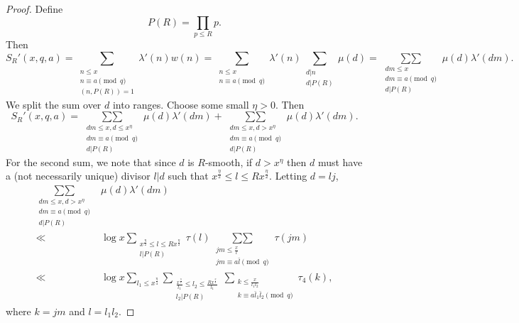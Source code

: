 \documentclass{amsart}
\begin{document}
\begin{proof}
Define
$$P(R)=\prod_{p\leq R}p.$$
Then
$$S_R'(x,q,a)=\sum_{\substack{n\leq x \\n\equiv a \pmod q \\ (n,P(R))=1}}\lambda'(n)w(n)=\sum_{\substack{n\leq x \\n\equiv a \pmod q}}\lambda'(n)\sum_{\substack{d|n \\ d|P(R)}}\mu(d)=\mathop{\sum\sum}\limits_{\substack{dm\leq x \\ dm\equiv a\pmod q \\ d|P(R)}}\mu(d)\lambda'(dm).$$
We split the sum over $d$ into ranges.  Choose some small $\eta>0$.  Then
$$S_R'(x,q,a)=\mathop{\sum\sum}\limits_{\substack{dm\leq x,d\leq x^\eta \\ dm\equiv a\pmod q \\ d|P(R)}}\mu(d)\lambda'(dm)+\mathop{\sum\sum}\limits_{\substack{dm\leq x,d>x^\eta \\ dm\equiv a\pmod q \\ d|P(R)}}\mu(d)\lambda'(dm).$$
For the second sum, we note that since $d$ is $R$-smooth, if $d>x^\eta$ then $d$ must have a (not necessarily unique) divisor $l|d$ such that $x^\frac \eta 2\leq l\leq Rx^\frac \eta 2$.  Letting $d=lj$,
\begin{align*}
\mathop{\sum\sum}\limits_{\substack{dm\leq x,d>x^\eta \\ dm\equiv a\pmod q \\ d|P(R)}}&\mu(d)\lambda'(dm)\\
\ll &\log x\sum_{\substack{x^\frac \eta 2\leq l\leq Rx^\frac \eta 2 \\ l|P(R)}}\tau(l)\mathop{\sum\sum}\limits_{\substack{jm\leq \frac xl \\ jm\equiv a\bar l\pmod q }}\tau(jm)\\
\ll & \log x\sum_{l_1\leq x^{\frac \eta 4}}\sum_{\substack{\frac{x^\frac \eta 2}{l_1}\leq l_2\leq \frac{Rx^\frac \eta 2}{l_1} \\ l_2|P(R)}}\mathop{\sum}\limits_{\substack{k\leq \frac x{l_1l_2} \\ k\equiv a\bar l_1\bar l_2\pmod q }}\tau_4(k),
\end{align*}
where $k=jm$ and $l=l_1l_2$.


\end{proof}
\end{document}
